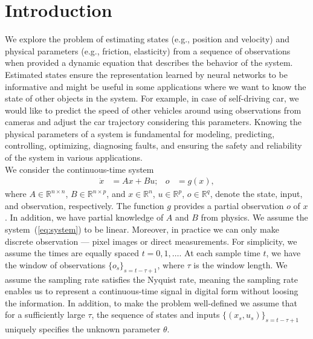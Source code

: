 \documentclass[acmtog]{techreportacmart}
\begin{document}
\section{Introduction} %
We explore the problem of estimating states (e.g., position and velocity) and physical parameters (e.g., friction, elasticity) from a sequence of observations when provided a dynamic equation that describes the behavior of the system. Estimated states ensure the representation learned by neural networks to be informative and might be useful in some applications where we want to know the state of other objects in the system. For example, in case of self-driving car, we would like to predict the speed of other vehicles around using observations from cameras and adjust the car trajectory considering this parameters. Knowing the physical parameters of a system is fundamental for modeling, predicting, controlling, optimizing, diagnosing faults, and ensuring the safety and reliability of the system in various applications.
\\
We consider the continuous-time system
\begin{align}
  \label{eq:system}
  \dot{x} &= Ax + Bu; & o &= g(x),
\end{align}
where $A \in \mathbb{R}^{n \times n}$, $B \in \mathbb{R}^{n \times p}$, and $x \in \mathbb{R}^n$, $u \in \mathbb{R}^p$, $o \in \mathbb{R}^q$, denote the state, input, and observation, respectively. The function $g$ provides a partial observation $o$ of $x$. In addition, we have partial knowledge of $A$ and $B$ from physics. We assume the system~(\ref{eq:system}) to be linear. Moreover, in practice we can only make discrete observation --- pixel images or direct measurements. For simplicity, we assume the times are equally spaced $t = 0, 1, \ldots$. At each sample time $t$, we have the window of observations $\{o_s\}_{s=t-\tau+1}$, where $\tau$ is the window length. We assume the sampling rate satisfies the Nyquist rate, meaning the sampling rate enables us to represent a continuous-time signal in digital form without loosing the information. In addition, to make the problem well-defined we assume that for a sufficiently large $\tau$, the sequence of states and inputs $\{(x_s, u_s)\}_{s=t-\tau+1}$ uniquely specifies the unknown parameter $\theta$.
\end{document}
